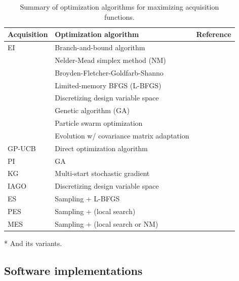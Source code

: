 \documentclass[journal ]{new-aiaa}
\begin{document}
	\begin{table}[t]
		\centering
		\begin{threeparttable}
			\caption{Summary of optimization algorithms for maximizing acquisition functions.}
			\begin{tabularx}{\textwidth}{lXX}
				\toprule
				Acquisition & Optimization algorithm & Reference\\
				\midrule
				EI\tnote{*} & Branch-and-bound algorithm & \cite{Jones1998}\\
				& Nelder-Mead simplex method (NM) & \cite{Huang2006smo,Huang2006jgo}\\
				& Broyden-Fletcher-Goldfarb-Shanno & \cite{Sobester2005}\\
				& Limited-memory BFGS (L-BFGS) & \cite{Frazier2018,Bonfiglio2018b}\\
				& Discretizing design variable space & \cite{Ghoreishi2019,Grassi2023}\\
				& Genetic algorithm (GA) & \cite{Forrester2007,Chen2016,ZhangY2018,Bailly2019,Do2022}\\
				& Particle swarm optimization & \cite{Kontogiannis2020b,Ribeiro2023}\\
				& Evolution w/ covariance matrix adaptation & \cite{Tran2020jcp,Tran2020cise}\\
				GP-UCB\tnote{*} & Direct optimization algorithm & \cite{Kandasamy2016,Kandasamy2017}\\
				PI\tnote{*} & GA & \cite{Ruan2020}\\
				KG & Multi-start stochastic gradient& \cite{WuJ2016}\\
				IAGO & Discretizing design variable space & \cite{Villemonteix2009}\\
				ES & Sampling + L-BFGS & \cite{Hennig2012}\\
				PES & Sampling + (local search)& \cite{HernandezLobato2014}\\
				MES & Sampling + (local search or NM)& \cite{WangZ2017}\\
				\bottomrule
			\end{tabularx}
			\begin{tablenotes}
				\item[*] \small{And its variants.}
			\end{tablenotes}
			\label{Table5}
		\end{threeparttable}
	\end{table}
	
	\subsection{Software implementations}\label{Sec55}
	
\end{document}
